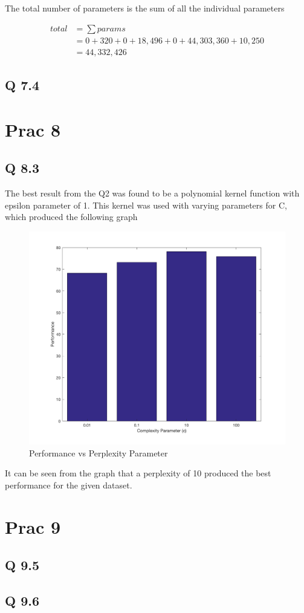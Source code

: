 The total number of parameters is the sum of all the individual parameters

\begin{align*}
	total &= \sum params\\
	&= 0 + 320 + 0 + 18,496 + 0 + 44,303,360 + 10,250\\
	&= 44,332,426
\end{align*}

\subsection*{Q 7.4}

\section*{Prac 8}

\subsection*{Q 8.3}


The best result from the Q2 was found to be a polynomial kernel function with epsilon parameter of 1.
This kernel was used with varying parameters for C, which produced the following graph

\begin{figure}[H]
	\centering
	\caption{Performance vs Perplexity Parameter}
	\includegraphics[width=0.7\linewidth]{../../pracs/prac8/q3}
\end{figure}

It can be seen from the graph that a perplexity of 10 produced the best performance for the given dataset.

\section*{Prac 9}

\subsection*{Q 9.5}

\subsection*{Q 9.6}



